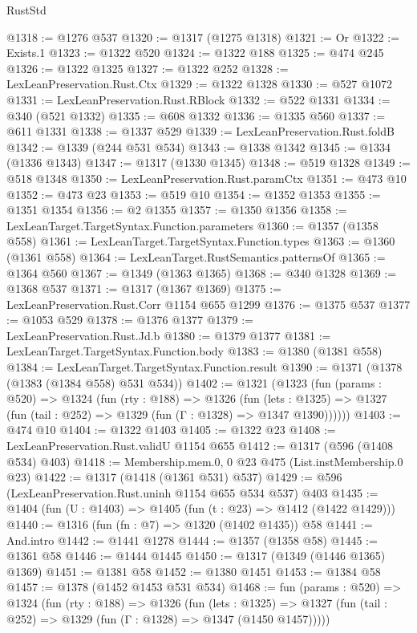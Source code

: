 \begin{lexlean}{RustStd}
\begin{coremodule}
@1318 := @1276 @537
@1320 := @1317 (@1275 @1318)
@1321 := Or
@1322 := Exists.{1}
@1323 := @1322 @520
@1324 := @1322 @188
@1325 := @474 @245
@1326 := @1322 @1325
@1327 := @1322 @252
@1328 := LexLeanPreservation.Rust.Ctx
@1329 := @1322 @1328
@1330 := @527 @1072
@1331 := LexLeanPreservation.Rust.RBlock
@1332 := @522 @1331
@1334 := @340 (@521 @1332)
@1335 := @608 @1332
@1336 := @1335 @560
@1337 := @611 @1331
@1338 := @1337 @529
@1339 := LexLeanPreservation.Rust.foldB
@1342 := @1339 (@244 @531 @534)
@1343 := @1338 @1342
@1345 := @1334 (@1336 @1343)
@1347 := @1317 (@1330 @1345)
@1348 := @519 @1328
@1349 := @518 @1348
@1350 := LexLeanPreservation.Rust.paramCtx
@1351 := @473 @10
@1352 := @473 @23
@1353 := @519 @10
@1354 := @1352 @1353
@1355 := @1351 @1354
@1356 := @2 @1355
@1357 := @1350 @1356
@1358 := LexLeanTarget.TargetSyntax.Function.parameters
@1360 := @1357 (@1358 @558)
@1361 := LexLeanTarget.TargetSyntax.Function.types
@1363 := @1360 (@1361 @558)
@1364 := LexLeanTarget.RustSemantics.patternsOf
@1365 := @1364 @560
@1367 := @1349 (@1363 @1365)
@1368 := @340 @1328
@1369 := @1368 @537
@1371 := @1317 (@1367 @1369)
@1375 := LexLeanPreservation.Rust.Corr @1154 @655 @1299
@1376 := @1375 @537
@1377 := @1053 @529
@1378 := @1376 @1377
@1379 := LexLeanPreservation.Rust.Jd.b
@1380 := @1379 @1377
@1381 := LexLeanTarget.TargetSyntax.Function.body
@1383 := @1380 (@1381 @558)
@1384 := LexLeanTarget.TargetSyntax.Function.result
@1390 := @1371 (@1378 (@1383 (@1384 @558) @531 @534))
@1402 := @1321
    (@1323
      (fun (params : @520) =>
      @1324
        (fun (rty : @188) =>
        @1326
          (fun (lets : @1325) =>
          @1327 (fun (tail : @252) => @1329 (fun (Γ : @1328) => @1347 @1390))))))
@1403 := @474 @10
@1404 := @1322 @1403
@1405 := @1322 @23
@1408 := LexLeanPreservation.Rust.validU @1154 @655
@1412 := @1317 (@596 (@1408 @534) @403)
@1418 := Membership.mem.{0, 0} @23 @475 (List.instMembership.{0} @23)
@1422 := @1317 (@1418 (@1361 @531) @537)
@1429 := @596 (LexLeanPreservation.Rust.uninh @1154 @655 @534 @537) @403
@1435 := @1404 (fun (U : @1403) => @1405 (fun (t : @23) => @1412 (@1422 @1429)))
@1440 := @1316 (fun (fn : @7) => @1320 (@1402 @1435)) @58
@1441 := And.intro
@1442 := @1441 @1278
@1444 := @1357 (@1358 @58)
@1445 := @1361 @58
@1446 := @1444 @1445
@1450 := @1317 (@1349 (@1446 @1365) @1369)
@1451 := @1381 @58
@1452 := @1380 @1451
@1453 := @1384 @58
@1457 := @1378 (@1452 @1453 @531 @534)
@1468 := fun (params : @520) =>
  @1324
    (fun (rty : @188) =>
    @1326
      (fun (lets : @1325) =>
      @1327 (fun (tail : @252) => @1329 (fun (Γ : @1328) => @1347 (@1450 @1457)))))

\end{coremodule}
\end{lexlean}
